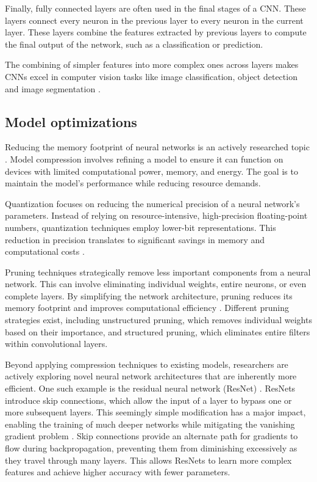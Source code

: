Finally, fully connected layers are often used in the final stages of a CNN.
These layers connect every neuron in the previous layer to every neuron in the current layer.
These layers combine the features extracted by previous layers to compute the final output of the network, such as a classification or prediction.

The combining of simpler features into more complex ones across layers makes CNNs excel in computer vision tasks like image classification, object detection and image segmentation \cite{krizhevskyImageNetClassificationDeep2017}.

\subsection{Model optimizations}
Reducing the memory footprint of neural networks is an actively researched topic \cite{neillOverviewNeuralNetwork2020, leEfficientNeuralNetworks2023}.
Model compression involves refining a model to ensure it can function on devices with limited computational power, memory, and energy.
The goal is to maintain the model's performance while reducing resource demands.

Quantization focuses on reducing the numerical precision of a neural network's parameters.
Instead of relying on resource-intensive, high-precision floating-point numbers, quantization techniques employ lower-bit representations.
This reduction in precision translates to significant savings in memory and computational costs \autocite{guoSurveyMethodsTheories2018}.

Pruning techniques strategically remove less important components from a neural network.
This can involve eliminating individual weights, entire neurons, or even complete layers.
By simplifying the network architecture, pruning reduces its memory footprint and improves computational efficiency \cite{blalockWhatStateNeural2020}.
Different pruning strategies exist, including unstructured pruning, which removes individual weights based on their importance, and structured pruning, which eliminates entire filters within convolutional layers.

Beyond applying compression techniques to existing models, researchers are actively exploring novel neural network architectures that are inherently more efficient.
One such example is the residual neural network (ResNet) \autocite{heDeepResidualLearning2015}.
ResNets introduce skip connections, which allow the input of a layer to bypass one or more subsequent layers.
This seemingly simple modification has a major impact, enabling the training of much deeper networks while mitigating the vanishing gradient problem \cite{pascanuDifficultyTrainingRecurrent2012}.
Skip connections provide an alternate path for gradients to flow during backpropagation, preventing them from diminishing excessively as they travel through many layers.
This allows ResNets to learn more complex features and achieve higher accuracy with fewer parameters. 

